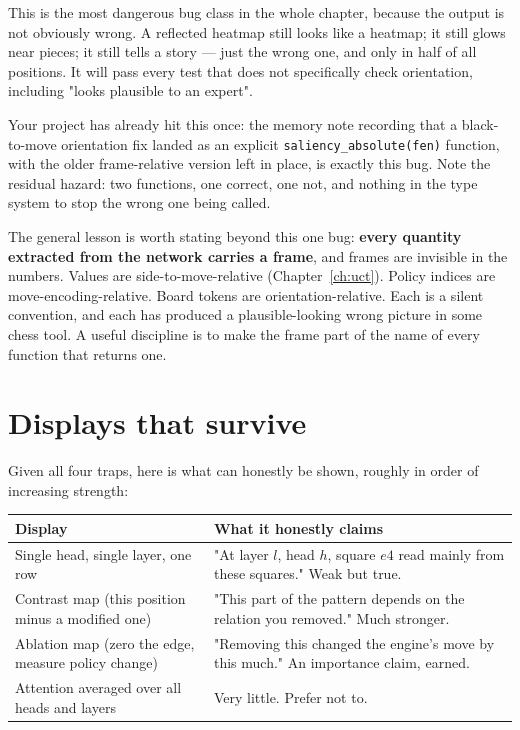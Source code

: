 \begin{pitfall}
This is the most dangerous bug class in the whole chapter, because the output is not obviously
wrong. A reflected heatmap still looks like a heatmap; it still glows near pieces; it still
tells a story --- just the wrong one, and only in half of all positions. It will pass every
test that does not specifically check orientation, including "looks plausible to an expert".

Your project has already hit this once: the memory note recording that a black-to-move
orientation fix landed as an explicit \texttt{saliency\_absolute(fen)} function, with the older
frame-relative version left in place, is exactly this bug. Note the residual hazard: two
functions, one correct, one not, and nothing in the type system to stop the wrong one being
called.
\end{pitfall}

The general lesson is worth stating beyond this one bug: \textbf{every quantity extracted from
the network carries a frame}, and frames are invisible in the numbers. Values are
side-to-move-relative (Chapter~\ref{ch:uct}). Policy indices are move-encoding-relative. Board
tokens are orientation-relative. Each is a silent convention, and each has produced a
plausible-looking wrong picture in some chess tool. A useful discipline is to make the frame
part of the name of every function that returns one.

\section{Displays that survive}

Given all four traps, here is what can honestly be shown, roughly in order of increasing
strength:

\begin{center}
\begin{tabular}{@{}p{5.1cm}p{8.2cm}@{}}
\toprule
Display & What it honestly claims \\
\midrule
Single head, single layer, one row & "At layer $l$, head $h$, square $e4$ read mainly from
these squares." Weak but true. \\
\addlinespace
Contrast map (this position minus a modified one) & "This part of the pattern depends on the
relation you removed." Much stronger. \\
\addlinespace
Ablation map (zero the edge, measure policy change) & "Removing this changed the engine's
move by this much." An importance claim, earned. \\
\addlinespace
Attention averaged over all heads and layers & Very little. Prefer not to. \\
\bottomrule
\end{tabular}
\end{center}

